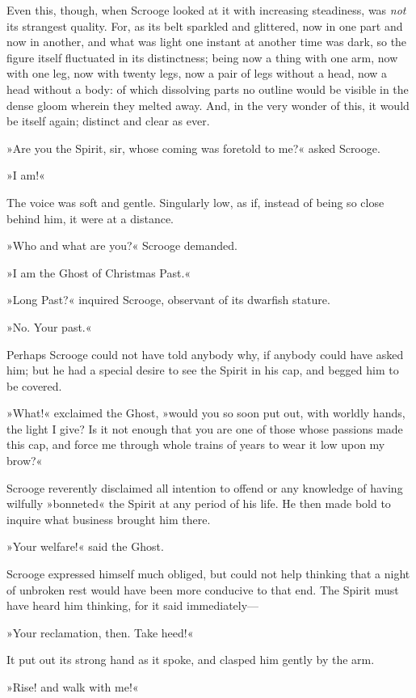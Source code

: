 Even this, though, when Scrooge looked at it with increasing steadiness, was \textit{not} its strangest quality. For, as its belt sparkled and glittered, now in one part and now in another, and what was light one instant at another time was dark, so the figure itself fluctuated in its distinctness; being now a thing with one arm, now with one leg, now with twenty legs, now a pair of legs without a head, now a head without a body: of which dissolving parts no outline would be visible in the dense gloom wherein they melted away. And, in the very wonder of this, it would be itself again; distinct and clear as ever.

»Are you the Spirit, sir, whose coming was foretold to me?« asked Scrooge.

»I am!«

The voice was soft and gentle. Singularly low, as if, instead of being so close behind him, it were at a distance.

»Who and what are you?« Scrooge demanded.

»I am the Ghost of Christmas Past.«

»Long Past?« inquired Scrooge, observant of its dwarfish stature.

»No. Your past.«

Perhaps Scrooge could not have told anybody why, if anybody could have asked him; but he had a special desire to see the Spirit in his cap, and begged him to be covered.

»What!« exclaimed the Ghost, »would you so soon put out, with worldly hands, the light I give? Is it not enough that you are one of those whose passions made this cap, and force me through whole trains of years to wear it low upon my brow?«

Scrooge reverently disclaimed all intention to offend or any knowledge of having wilfully »bonneted« the Spirit at any period of his life. He then made bold to inquire what business brought him there.

»Your welfare!« said the Ghost.

Scrooge expressed himself much obliged, but could not help thinking that a night of unbroken rest would have been more conducive to that end. The Spirit must have heard him thinking, for it said immediately--- 

»Your reclamation, then. Take heed!«

It put out its strong hand as it spoke, and clasped him gently by the arm.

»Rise! and walk with me!«

